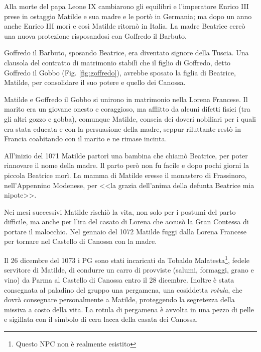\documentclass[letterpaper,twocolumn,openany,nodeprecatedcode]{dndbook}
\begin{document}
Alla morte del papa Leone IX cambiarono gli equilibri e l'imperatore Enrico III prese in ostaggio Matilde e sua madre e le portò in Germania; ma dopo un anno anche Enrico III morì e così Matilde ritornò in Italia. La madre Beatrice cercò una nuova protezione risposandosi con Goffredo il Barbuto.

Goffredo il Barbuto, sposando Beatrice, era diventato signore della Tuscia. Una clausola del contratto di matrimonio stabilì che il figlio di Goffredo, detto Goffredo il Gobbo (Fig. \ref{fig:goffredo}), avrebbe sposato la figlia di Beatrice, Matilde, per consolidare il suo potere e quello dei Canossa.

Matilde e Goffredo il Gobbo si unirono in matrimonio nella Lorena Francese. Il marito era un giovane onesto e coraggioso, ma afflitto da alcuni difetti fisici (tra gli altri gozzo e gobba), comunque Matilde, conscia dei doveri nobiliari per i quali era stata educata e con la persuasione della madre, seppur riluttante restò in Francia coabitando con il marito e ne rimase incinta.

All'inizio del 1071 Matilde partorì una bambina che chiamò Beatrice, per poter rinnovare il nome della madre. Il parto però non fu facile e dopo pochi giorni la piccola Beatrice morì. La mamma di Matilde eresse il monastero di Frassinoro, nell'Appennino Modenese, per <<la grazia dell'anima della defunta Beatrice mia nipote>>.

Nei mesi successivi Matilde rischiò la vita, non solo per i postumi del parto difficile, ma anche per l'ira del casato di Lorena che accusò la Gran Contessa di portare il malocchio. Nel gennaio del 1072 Matilde fuggi dalla Lorena Francese per tornare nel Castello di Canossa con la madre.

Il 26 dicembre del 1073 i PG sono stati incaricati da Tobaldo Malatesta\footnote{Questo NPC non è realmente esistito}, fedele servitore di Matilde, di condurre un carro di provviste (salumi, formaggi, grano e vino) da Parma al Castello di Canossa entro il 28 dicembre. Inoltre è stata consegnata al paladino del gruppo  una pergamena, una cosiddetta \textit{rotula}, che dovrà consegnare personalmente a Matilde, proteggendo la segretezza della missiva a costo della vita. La rotula di pergamena è avvolta in una pezzo di pelle e sigillata con il simbolo di cera lacca della casata dei Canossa. 
\end{document}
